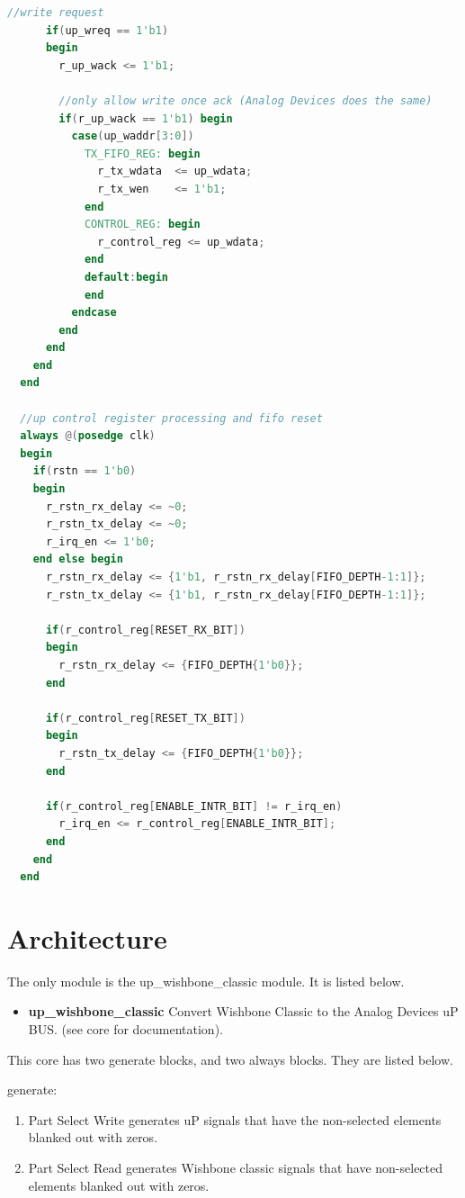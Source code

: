 \begin{lstlisting}[language=Verilog]
      //write request
      if(up_wreq == 1'b1)
      begin
        r_up_wack <= 1'b1;

        //only allow write once ack (Analog Devices does the same)
        if(r_up_wack == 1'b1) begin
          case(up_waddr[3:0])
            TX_FIFO_REG: begin
              r_tx_wdata  <= up_wdata;
              r_tx_wen    <= 1'b1;
            end
            CONTROL_REG: begin
              r_control_reg <= up_wdata;
            end
            default:begin
            end
          endcase
        end
      end
    end
  end

  //up control register processing and fifo reset
  always @(posedge clk)
  begin
    if(rstn == 1'b0)
    begin
      r_rstn_rx_delay <= ~0;
      r_rstn_tx_delay <= ~0;
      r_irq_en <= 1'b0;
    end else begin
      r_rstn_rx_delay <= {1'b1, r_rstn_rx_delay[FIFO_DEPTH-1:1]};
      r_rstn_tx_delay <= {1'b1, r_rstn_rx_delay[FIFO_DEPTH-1:1]};

      if(r_control_reg[RESET_RX_BIT])
      begin
        r_rstn_rx_delay <= {FIFO_DEPTH{1'b0}};
      end

      if(r_control_reg[RESET_TX_BIT])
      begin
        r_rstn_tx_delay <= {FIFO_DEPTH{1'b0}};
      end

      if(r_control_reg[ENABLE_INTR_BIT] != r_irq_en)
        r_irq_en <= r_control_reg[ENABLE_INTR_BIT];
      end
    end
  end
\end{lstlisting}

\section{Architecture}
\par
The only module is the up\_wishbone\_classic module. It is listed below.

\begin{itemize}
  \item \textbf{up\_wishbone\_classic} Convert Wishbone Classic to the Analog Devices uP BUS. (see core for documentation).
\end{itemize}

\par
This core has two generate blocks, and two always blocks. They are listed below.

generate:
\begin{enumerate}
\item Part Select Write generates uP signals that have the non-selected elements blanked out with zeros.
\item Part Select Read generates Wishbone classic signals that have non-selected elements blanked out with zeros.
\end{enumerate}

